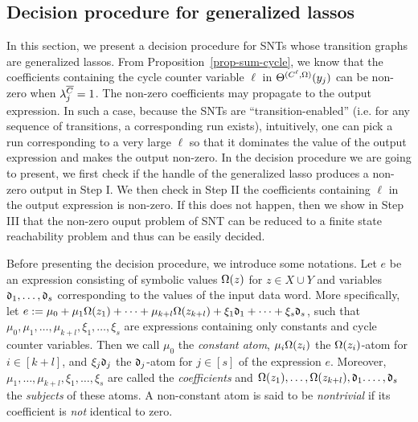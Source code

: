 

\subsection{Decision procedure for generalized lassos}\label{sec-glasso}

%
In this section, we present a decision procedure for SNTs whose transition graphs are generalized lassos. From Proposition~\ref{prop-sum-cycle}, we know that the coefficients containing the cycle counter variable $\ell$ in $\Theta^{(C^\ell,\Omega)}(y_j)$ can be non-zero when $\lambda^{\overline{C}}_{j}=1$. The non-zero coefficients may propagate to the output expression.  In such a case, 
because the SNTs are ``transition-enabled'' (i.e. for any sequence of transitions, a corresponding run exists), %
intuitively, one can pick a run corresponding to a very large $\ell$ so that it dominates the value of the output expression and makes the output non-zero. 
In the decision procedure we are going to present, we first check if the handle of the generalized lasso produces a non-zero output in Step I.
We then check in Step II the coefficients containing $\ell$ in the output expression is non-zero. If this does not happen, then we show in Step III that the non-zero ouput problem of SNT can be reduced to a finite state reachability problem and thus can be easily decided.

Before presenting the decision procedure, we introduce some notations.
Let $e$ be an expression consisting of symbolic values $\Omega(z)$ for $z\in X\cup Y$ and variables $\mathfrak{d}_1, \dots, \mathfrak{d}_{s}$ corresponding to the values of the input data word. More specifically, let $e:=\mu_0 + \mu_1 \Omega(z_1) +\dots + \mu_{k+l} \Omega(z_{k+l}) + \xi_1 \mathfrak{d}_1 + \dots + \xi_{s} \mathfrak{d}_{s}$,
such that $\mu_0,\mu_1,\dots,\mu_{k+l}, \xi_1,\dots,\xi_{s}$ are expressions containing only constants and cycle counter variables.
Then we call $\mu_0$ the \emph{constant atom}, $\mu_i \Omega(z_i)$ the $\Omega(z_i)$-atom for $i\in[k+l]$, and $\xi_j \mathfrak{d}_j$ the $\mathfrak{d}_j$-atom for $j\in[s]$ of the expression $e$. Moreover, $\mu_1, \dots, \mu_{k+l}, \xi_1,\dots, \xi_{s}$ are called the \emph{coefficients} and $\Omega(z_1), \dots, \Omega(z_{k+l}), \mathfrak{d}_1. \dots, \mathfrak{d}_{s}$ the \emph{subjects} of these atoms.
A non-constant atom is said to be \emph{nontrivial} if its coefficient is \emph{not} identical to zero.

